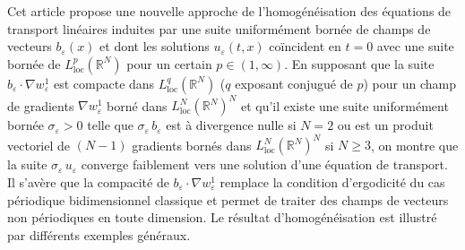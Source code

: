 \documentclass[JEP,XML,SOM,Unicode]{cedram}
\theoremstyle{plain}
\theoremstyle{definition}
\begin{document}
\begin{altabstract}
Cet article propose une nouvelle approche de l'homogénéisation des équations de transport linéaires induites par une suite uniformément bornée de champs de vecteurs $b_\varepsilon(x)$ et dont les solutions $u_\varepsilon(t,x)$ coïncident en $t=0$ avec une suite bornée de $L^p_\mathrm{loc}(\mathbb{R}^N)$ pour un certain $p\in(1,\infty)$. En supposant que la suite $b_\varepsilon\cdot\nabla w_\varepsilon^1$ est compacte dans $L^q_\mathrm{loc}(\mathbb{R}^N)$ ($q$ exposant conjugué de $p$) pour un champ de gradients $\nabla w_\varepsilon^1$ borné dans $L^N_\mathrm{loc}(\mathbb{R}^N)^N$ et qu'il existe une suite uniformément bornée $\sigma_\varepsilon>0$ telle que $\sigma_\varepsilon\,b_\varepsilon$ est à divergence nulle si $N\!=\!2$ ou est un produit vectoriel de $(N\!-\!1)$ gradients bornés dans $L^N_\mathrm{loc}(\mathbb{R}^N)^N$ si $N\!\geq\!3$, on montre que la suite $\sigma_\varepsilon\,u_\varepsilon$ converge faiblement vers une solution d'une équation de transport. Il s'avère que la compacité de $b_\varepsilon\cdot\nabla w_\varepsilon^1$ remplace la condition d'ergodicité du cas périodique bidimensionnel classique et permet de traiter des champs de vecteurs non périodiques en toute dimension. Le résultat d'homogénéisation est illustré par différents exemples généraux.
\end{altabstract}

\maketitle
\tableofcontents
\mainmatter
\end{document}
